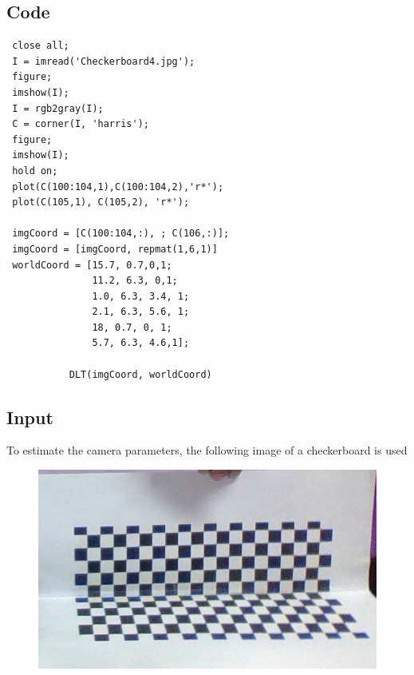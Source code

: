 \documentclass[12pt]{article}
\begin{document}
\subsection{Code}
\begin{lstlisting}
 close all;
 I = imread('Checkerboard4.jpg');
 figure;
 imshow(I);
 I = rgb2gray(I);
 C = corner(I, 'harris');
 figure;
 imshow(I);
 hold on;
 plot(C(100:104,1),C(100:104,2),'r*');
 plot(C(105,1), C(105,2), 'r*');

 imgCoord = [C(100:104,:), ; C(106,:)];
 imgCoord = [imgCoord, repmat(1,6,1)]
 worldCoord = [15.7, 0.7,0,1;
               11.2, 6.3, 0,1;
               1.0, 6.3, 3.4, 1;
               2.1, 6.3, 5.6, 1;
               18, 0.7, 0, 1;
               5.7, 6.3, 4.6,1];
           
           DLT(imgCoord, worldCoord)       

\end{lstlisting}

\subsection{Input}
To estimate the camera parameters, the following  image of a checkerboard is used
\begin{figure}[htp]
\centering
\includegraphics[width=1\textwidth]{Checkerboard4.jpg}\hfill
\end{figure}
\clearpage
\end{document}
